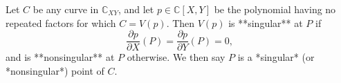 Let $C$ be any curve in $\mathbb{C}_{XY}$, and let $p \in \mathbb{C}[X, Y]$ be the polynomial having no repeated factors for which $C = V(p)$. Then $V(p)$ is **singular** at $P$ if
$$\frac{\partial p}{\partial X}(P) = \frac{\partial p}{\partial Y}(P) = 0,$$
and is **nonsingular** at $P$ otherwise. We then say $P$ is a *singular* (or *nonsingular*) point of $C$.

